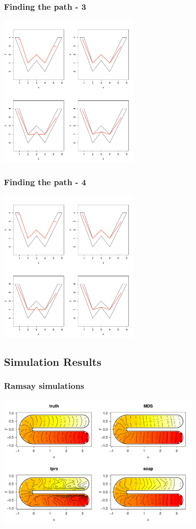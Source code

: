 \documentclass[ignorenonframetext]{beamer} %
\begin{document}
\begin{frame}
	\frametitle{Finding the path - 3}
            \centering
              \includegraphics[width=2.75in]{figs/wood-3}\\
\end{frame}

\begin{frame}
	\frametitle{Finding the path - 4}
            \centering
              \includegraphics[width=2.75in]{figs/wood-4}\\
\end{frame}


\subsection{Simulation Results}

\begin{frame}
	\frametitle{Ramsay simulations}
            \centering
              \includegraphics[width=4in]{figs/ramsay-low.pdf}\\
\end{frame}
\end{document}
